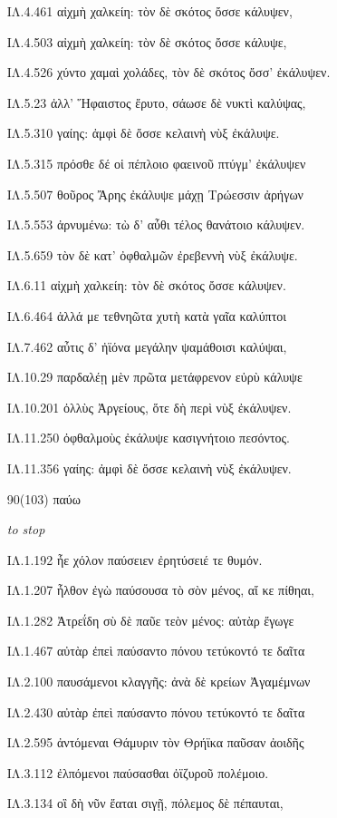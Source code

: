 \begin{enumerate}
{ΙΛ.4.461 αἰχμὴ χαλκείη: τὸν δὲ σκότος ὄσσε κάλυψεν, 

ΙΛ.4.503 αἰχμὴ χαλκείη: τὸν δὲ σκότος ὄσσε κάλυψε, 

ΙΛ.4.526 χύντο χαμαὶ χολάδες, τὸν δὲ σκότος ὄσσ' ἐκάλυψεν. 

ΙΛ.5.23 ἀλλ' Ἥφαιστος ἔρυτο, σάωσε δὲ νυκτὶ καλύψας, 

ΙΛ.5.310 γαίης: ἀμφὶ δὲ ὄσσε κελαινὴ νὺξ ἐκάλυψε. 

ΙΛ.5.315 πρόσθε δέ οἱ πέπλοιο φαεινοῦ πτύγμ' ἐκάλυψεν 

ΙΛ.5.507 θοῦρος Ἄρης ἐκάλυψε μάχῃ Τρώεσσιν ἀρήγων 

ΙΛ.5.553 ἀρνυμένω: τὼ δ' αὖθι τέλος θανάτοιο κάλυψεν. 

ΙΛ.5.659 τὸν δὲ κατ' ὀφθαλμῶν ἐρεβεννὴ νὺξ ἐκάλυψε. 

ΙΛ.6.11 αἰχμὴ χαλκείη: τὸν δὲ σκότος ὄσσε κάλυψεν. 

ΙΛ.6.464 ἀλλά με τεθνηῶτα χυτὴ κατὰ γαῖα καλύπτοι 

ΙΛ.7.462 αὖτις δ' ἠϊόνα μεγάλην ψαμάθοισι καλύψαι, 

ΙΛ.10.29 παρδαλέῃ μὲν πρῶτα μετάφρενον εὐρὺ κάλυψε 

ΙΛ.10.201 ὀλλὺς Ἀργείους, ὅτε δὴ περὶ νὺξ ἐκάλυψεν. 

ΙΛ.11.250 ὀφθαλμοὺς ἐκάλυψε κασιγνήτοιο πεσόντος. 

ΙΛ.11.356 γαίης: ἀμφὶ δὲ ὄσσε κελαινὴ νὺξ ἐκάλυψεν. 

}

\clearpage
\item[\large 90(103)]{\large \g παύω}

\hspace{0.2cm} \textit{ to stop }

{\g
ΙΛ.1.192 ἦε χόλον παύσειεν ἐρητύσειέ τε θυμόν. 

ΙΛ.1.207 ἦλθον ἐγὼ παύσουσα τὸ σὸν μένος, αἴ κε πίθηαι, 

ΙΛ.1.282 Ἀτρεΐδη σὺ δὲ παῦε τεὸν μένος: αὐτὰρ ἔγωγε 

ΙΛ.1.467 αὐτὰρ ἐπεὶ παύσαντο πόνου τετύκοντό τε δαῖτα 

ΙΛ.2.100 παυσάμενοι κλαγγῆς: ἀνὰ δὲ κρείων Ἀγαμέμνων 

ΙΛ.2.430 αὐτὰρ ἐπεὶ παύσαντο πόνου τετύκοντό τε δαῖτα 

ΙΛ.2.595 ἀντόμεναι Θάμυριν τὸν Θρήϊκα παῦσαν ἀοιδῆς 

ΙΛ.3.112 ἐλπόμενοι παύσασθαι ὀϊζυροῦ πολέμοιο. 

ΙΛ.3.134 οἳ δὴ νῦν ἕαται σιγῇ, πόλεμος δὲ πέπαυται, 

}
\end{enumerate}
